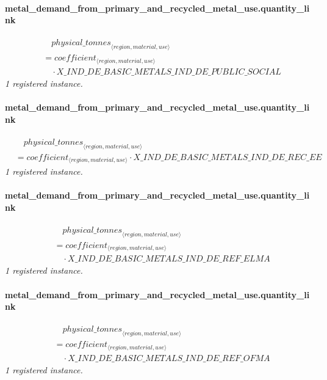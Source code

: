 \documentclass[11pt]{article}
\begin{document}
\paragraph{metal\_demand\_from\_primary\_and\_recycled\_metal\_use.quantity\_link}
\begin{align*}
&\quad {physical\_tonnes}_{\langle region, material, use\rangle}\\
&= coefficient_{\langle region, material, use\rangle}\\
&\quad {}\cdot X\_IND\_DE\_BASIC\_METALS\_IND\_DE\_PUBLIC\_SOCIAL
\end{align*}
\noindent\emph{1 registered instance.}\par
\paragraph{metal\_demand\_from\_primary\_and\_recycled\_metal\_use.quantity\_link}
\begin{align*}
&\quad {physical\_tonnes}_{\langle region, material, use\rangle}\\
&= coefficient_{\langle region, material, use\rangle} \cdot X\_IND\_DE\_BASIC\_METALS\_IND\_DE\_REC\_EE
\end{align*}
\noindent\emph{1 registered instance.}\par
\paragraph{metal\_demand\_from\_primary\_and\_recycled\_metal\_use.quantity\_link}
\begin{align*}
&\quad {physical\_tonnes}_{\langle region, material, use\rangle}\\
&= coefficient_{\langle region, material, use\rangle}\\
&\quad {}\cdot X\_IND\_DE\_BASIC\_METALS\_IND\_DE\_REF\_ELMA
\end{align*}
\noindent\emph{1 registered instance.}\par
\paragraph{metal\_demand\_from\_primary\_and\_recycled\_metal\_use.quantity\_link}
\begin{align*}
&\quad {physical\_tonnes}_{\langle region, material, use\rangle}\\
&= coefficient_{\langle region, material, use\rangle}\\
&\quad {}\cdot X\_IND\_DE\_BASIC\_METALS\_IND\_DE\_REF\_OFMA
\end{align*}
\noindent\emph{1 registered instance.}\par
\end{document}
